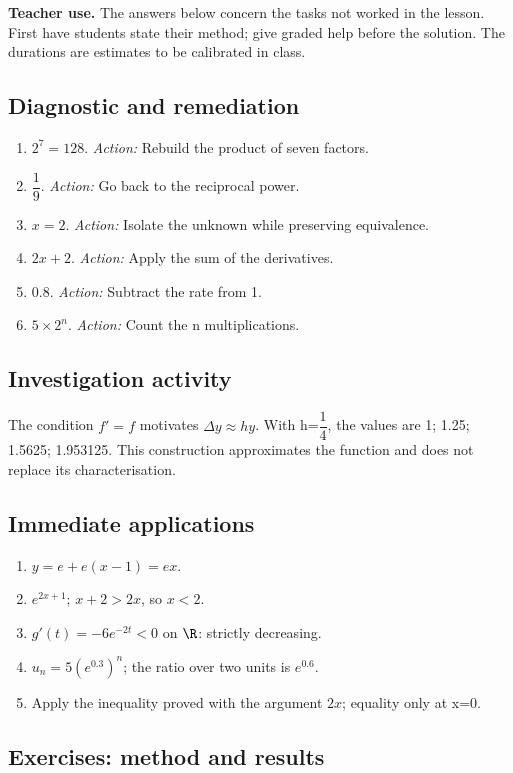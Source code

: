 \label{C09-CORR}
\textbf{Teacher use.} The answers below concern the tasks not worked in the lesson. First have students state their method; give graded help before the solution. The durations are estimates to be calibrated in class.
\subsection*{Diagnostic and remediation}
\begin{enumerate}
\item $2^7=128$. \textit{Action:} Rebuild the product of seven factors.
\item $\dfrac{1}{9}$. \textit{Action:} Go back to the reciprocal power.
\item $x=2$. \textit{Action:} Isolate the unknown while preserving equivalence.
\item $2x+2$. \textit{Action:} Apply the sum of the derivatives.
\item $0.8$. \textit{Action:} Subtract the rate from 1.
\item $5\times2^n$. \textit{Action:} Count the n multiplications.
\end{enumerate}
\subsection*{Investigation activity}
The condition $f\prime=f$ motivates $\Delta y\approx h y$. With h=$\dfrac{1}{4}$, the values are 1; 1.25; 1.5625; 1.953125. This construction approximates the function and does not replace its characterisation.
\subsection*{Immediate applications}
\begin{enumerate}
\item $y=e+e(x-1)=ex$.
\item $e^{2x+1}$; $x+2>2x$, so $x<2$.
\item $g\prime(t)=-6e^{-2t}<0$ on $\R$: strictly decreasing.
\item $u_n=5(e^{0.3})^n$; the ratio over two units is $e^{0.6}$.
\item Apply the inequality proved with the argument $2x$; equality only at x=0.
\end{enumerate}
\subsection*{Exercises: method and results}
